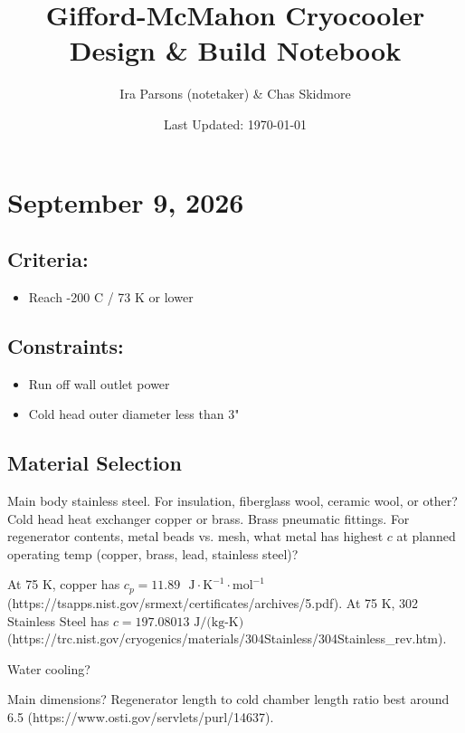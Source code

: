 \documentclass{article}
\title{Gifford-McMahon Cryocooler Design \& Build Notebook}
\author{Ira Parsons (notetaker) \& Chas Skidmore}
\date{Last Updated: \today}
\begin{document}
\maketitle

\section*{September 9, 2026}

\subsection*{Criteria:}

\begin{itemize}
\item Reach -200 C / 73 K or lower
\end{itemize}

\subsection*{Constraints:}

\begin{itemize}
 \item Run off wall outlet power
 \item Cold head outer diameter less than 3"
\end{itemize}

\subsection*{Material Selection}

Main body stainless steel.  For insulation, fiberglass wool, ceramic wool, or other?  Cold head heat exchanger copper or brass.  Brass pneumatic fittings.  For regenerator contents, metal beads vs. mesh, what metal has highest $c$ at planned operating temp (copper, brass, lead, stainless steel)?

At 75 K, copper has $c_p = 11.89 \text{ } \text{J}\cdot\text{K}^{-1}\cdot\text{mol}^{-1}$ (https://tsapps.nist.gov/srmext/certificates/archives/5.pdf).  At 75 K, 302 Stainless Steel has $c = 197.08013 \text{ J/(kg-K)}$ (https://trc.nist.gov/cryogenics/materials/304Stainless/304Stainless\_rev.htm).

Water cooling?

Main dimensions?  Regenerator length to cold chamber length ratio best around 6.5 (https://www.osti.gov/servlets/purl/14637).
\end{document}
